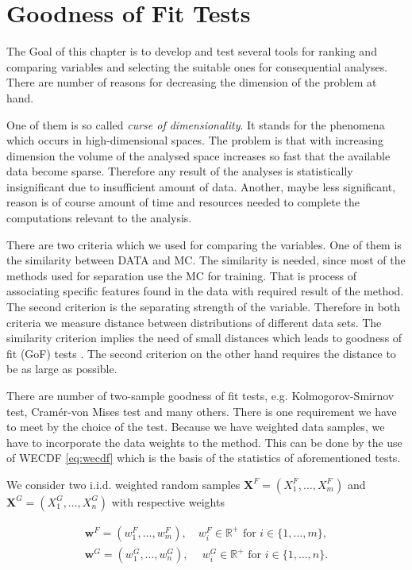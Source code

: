 \chapter{Goodness of Fit Tests}
\label{ch:GoF}

\noindent The Goal of this chapter is to develop and test several tools for ranking and comparing variables and selecting the suitable ones for consequential analyses. There are number of reasons for decreasing the dimension of the problem at hand. 

One of them is so called {\em curse of dimensionality}. It stands for the phenomena which occurs in high-dimensional spaces. The problem is that with increasing dimension the volume of the analysed space increases so fast that the available data become sparse. Therefore any result of the analyses is statistically insignificant due to insufficient amount of data. Another, maybe less significant, reason is of course amount of time and resources needed to complete the computations relevant to the analysis. 

There are two criteria which we used for comparing the variables. One of them is the similarity between DATA and MC. The similarity is needed, since most of the methods used for separation use the MC for training. That is process of associating specific features found in the data with required result of the method. The second criterion is the separating strength of the variable. Therefore in both criteria we measure distance between distributions of different data sets. The similarity criterion implies the need of small distances which leads to goodness of fit (GoF)  tests . The second criterion on the other hand requires the distance to be as large as possible. 

There are number of two-sample goodness of fit  tests, e.g. Kolmogorov-Smirnov test, Cram\'{e}r-von Mises test and many others. There is one requirement we have to meet by the choice of the test. Because we have weighted data samples, we have to incorporate the data weights to the method. This can be done by the use of WECDF  \eqref{eq:wecdf} which is the basis of the statistics of aforementioned tests. 

We consider two i.i.d. weighted random samples $\mathbf{X}^F = (X^F_1,\ldots, X^F_m)$ and $\mathbf{X}^G = (X^G_1, \ldots, X^G_n)$ with respective weights 

\begin{align*}
\mathbf{w}^F = (w^F_1,\ldots, w^F_m), \quad w_i^F \in \mathbb{R}^+ \text{ for }  i \in \lbrace 1, \ldots, m \rbrace, \\
\mathbf{w}^G = (w^G_1,\ldots, w^G_n), \:
\quad w_i^G \in \mathbb{R}^+ \text{ for } i \in \lbrace 1, \ldots, n \rbrace. 
\end{align*}

